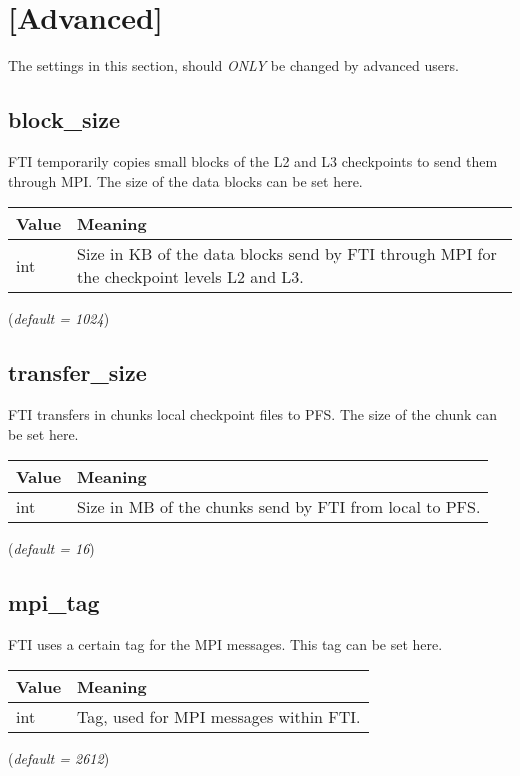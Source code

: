 \documentclass{refrep}
\begin{document}
\section{[Advanced]}\label{sec:advanced}
The settings in this section, should \emph{ONLY} be changed by advanced users.
\subsection{block\_size}\label{subsec:blocksize}
FTI temporarily copies small blocks of the L2 and L3 checkpoints to send them through MPI. The size of the data blocks can be set here.
\begin{center}
\begin{tabular}[h!]{|p{}|p{}|}
\hline
\textbf{Value} & \textbf{Meaning} \\ \hline
int & Size in KB of the data blocks send by FTI through MPI for the checkpoint levels L2 and L3. \\ \hline
\end{tabular}
\end{center}
(\textit{default = 1024})
\subsection{transfer\_size}\label{subsec:transfersize}
FTI transfers in chunks local checkpoint files to PFS. The size of the chunk can be set here.
\begin{center}
\begin{tabular}[h!]{|p{}|p{}|}
\hline
\textbf{Value} & \textbf{Meaning} \\ \hline
int & Size in MB of the chunks send by FTI from local to PFS. \\ \hline
\end{tabular}
\end{center}
(\textit{default = 16})
\subsection{mpi\_tag}\label{subsec:mpitag}
FTI uses a certain tag for the MPI messages. This tag can be set here.
\begin{center}
\begin{tabular}[h!]{|p{}|p{}|}
\hline
\textbf{Value} & \textbf{Meaning} \\ \hline
int & Tag, used for MPI messages within FTI. \\ \hline
\end{tabular}
\end{center}
(\textit{default = 2612})
\end{document}
